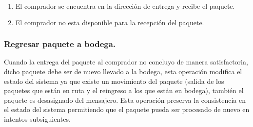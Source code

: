 \documentclass[12pt,a4paper]{article}
\begin{document}
\begin{enumerate}
\item El comprador se encuentra en la dirección de entrega y recibe el paquete.


\item El comprador no esta disponible para la recepción del paquete.


\end{enumerate}

\subsubsection{Regresar paquete a bodega.}
Cuando la entrega del paquete al comprador no concluyo de manera satisfactoria, dicho paquete debe ser de nuevo llevado a la bodega, esta operación modifica el estado del sistema ya que existe un movimiento del paquete (salida de los paquetes que están en ruta y el reingreso a los que están en bodega), también el paquete es desasignado del mensajero. Esta operación preserva la consistencia en el estado del sistema permitiendo que el paquete pueda ser procesado de nuevo en intentos subsiguientes.
\end{document}
